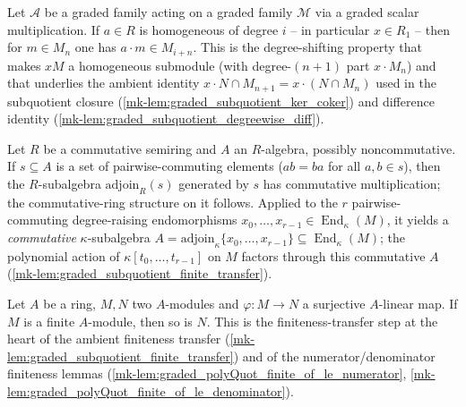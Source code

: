 \begin{lemma}
  \label{mk-lem:isHomogeneousElem_graded_smul_mathlib}
  \mathlibok

  Let \(\mathcal{A}\) be a graded family acting on a graded family \(\mathcal{M}\)
  via a graded scalar multiplication. If \(a \in R\) is homogeneous of degree
  \(i\) -- in particular \(x \in R_1\) -- then for \(m \in M_n\) one has
  \(a \cdot m \in M_{i+n}\). This is the degree-shifting property that makes \(xM\)
  a homogeneous submodule (with degree-\((n+1)\) part \(x \cdot M_n\)) and that
  underlies the ambient identity \(x \cdot N \cap M_{n+1} = x \cdot (N \cap M_n)\)
  used in the subquotient closure (\ref{mk-lem:graded_subquotient_ker_coker}) and
  difference identity (\ref{mk-lem:graded_subquotient_degreewise_diff}).
\end{lemma}

\begin{lemma}
  \label{mk-lem:adjoinCommRingOfComm_mathlib}
  \mathlibok

  Let \(R\) be a commutative semiring and \(A\) an \(R\)-algebra, possibly
  noncommutative. If \(s \subseteq A\) is a set of pairwise-commuting elements
  (\(a b = b a\) for all \(a, b \in s\)), then the \(R\)-subalgebra
  \(\mathrm{adjoin}_R(s)\) generated by \(s\) has commutative multiplication; the
  commutative-ring structure on it follows. Applied to the \(r\) pairwise-commuting degree-raising endomorphisms
  \(x_0, \dots, x_{r-1} \in \operatorname{End}_\kappa(M)\), it yields a
  \emph{commutative} \(\kappa\)-subalgebra \(A = \mathrm{adjoin}_\kappa\{x_0, \dots,
  x_{r-1}\} \subseteq \operatorname{End}_\kappa(M)\); the polynomial action of
  \(\kappa[t_0, \dots, t_{r-1}]\) on \(M\) factors through this commutative \(A\)
  (\ref{mk-lem:graded_subquotient_finite_transfer}).
\end{lemma}

\begin{lemma}
  \label{mk-lem:module_finite_of_surjective_mathlib}
  \mathlibok

  Let \(A\) be a ring, \(M, N\) two \(A\)-modules and \(\varphi : M \to N\) a
  surjective \(A\)-linear map. If \(M\) is a finite \(A\)-module, then so is \(N\).
  This is the finiteness-transfer step at the heart of the ambient finiteness
  transfer (\ref{mk-lem:graded_subquotient_finite_transfer}) and of the
  numerator/denominator finiteness lemmas
  (\ref{mk-lem:graded_polyQuot_finite_of_le_numerator},
  \ref{mk-lem:graded_polyQuot_finite_of_le_denominator}).
\end{lemma}

